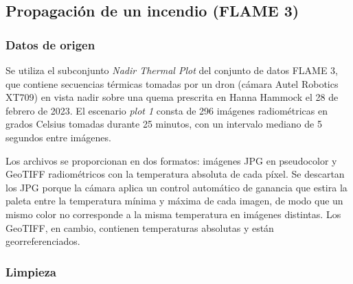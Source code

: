 \subsection{Propagación de un incendio (FLAME 3)}\label{sec:exp2_flame3}

\subsubsection{Datos de origen}

Se utiliza el subconjunto \textit{Nadir Thermal Plot} del conjunto de datos FLAME 3, que contiene secuencias térmicas tomadas por un dron (cámara Autel Robotics XT709) en vista nadir sobre una quema prescrita en Hanna Hammock el 28 de febrero de 2023. El escenario \textit{plot 1} consta de 296 imágenes radiométricas en grados Celsius tomadas durante 25 minutos, con un intervalo mediano de 5 segundos entre imágenes.

Los archivos se proporcionan en dos formatos: imágenes JPG en pseudocolor y GeoTIFF radiométricos con la temperatura absoluta de cada píxel. Se descartan los JPG porque la cámara aplica un control automático de ganancia que estira la paleta entre la temperatura mínima y máxima de cada imagen, de modo que un mismo color no corresponde a la misma temperatura en imágenes distintas. Los GeoTIFF, en cambio, contienen temperaturas absolutas y están georreferenciados.

\subsubsection{Limpieza}

